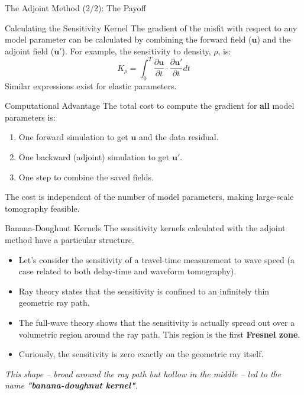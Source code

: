\documentclass{beamer}
\begin{document}
\begin{frame}{The Adjoint Method (2/2): The Payoff}
    \begin{block}{Calculating the Sensitivity Kernel}
        The gradient of the misfit with respect to any model parameter can be calculated by combining the forward field ($\mathbf{u}$) and the adjoint field ($\mathbf{u}'$). For example, the sensitivity to density, $\rho$, is:
        $$ K_{\rho} = \int_{0}^{T} \frac{\partial \mathbf{u}}{\partial t} \cdot \frac{\partial \mathbf{u}'}{\partial t} dt $$
        Similar expressions exist for elastic parameters.
    \end{block}
    \pause
    \begin{alertblock}{Computational Advantage}
        The total cost to compute the gradient for \textbf{all} model parameters is:
        \begin{enumerate}
            \item One forward simulation to get $\mathbf{u}$ and the data residual.
            \item One backward (adjoint) simulation to get $\mathbf{u}'$.
            \item One step to combine the saved fields.
        \end{enumerate}
        The cost is independent of the number of model parameters, making large-scale tomography feasible.
    \end{alertblock}
\end{frame}


\begin{frame}{Banana-Doughnut Kernels}
    The sensitivity kernels calculated with the adjoint method have a particular structure.
    \begin{itemize}
        \item Let's consider the sensitivity of a travel-time measurement to wave speed (a case related to both delay-time and waveform tomography).
        \pause
        \item Ray theory states that the sensitivity is confined to an infinitely thin geometric ray path.
        \pause
        \item The full-wave theory shows that the sensitivity is actually spread out over a volumetric region around the ray path. This region is the first \textbf{Fresnel zone}.
        \pause
        \item Curiously, the sensitivity is zero exactly on the geometric ray itself.
    \end{itemize}
    \pause
    \begin{center}
    \textit{This shape -- broad around the ray path but hollow in the middle -- led to the name \textbf{"banana-doughnut kernel"}.}
    \end{center}
\end{frame}
\end{document}
